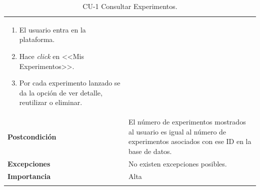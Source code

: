 \begin{longtable}[H]{@{}ll@{}}
\begin{minipage}[t]{0.71\columnwidth}
\begin{enumerate}
\def\labelenumi{\arabic{enumi}.}
\tightlist
\item El usuario entra en la plataforma.
\item Hace \textit{click} en <<Mis Experimentos>>.
\item Por cada experimento lanzado se da la opción de ver detalle, reutilizar o eliminar.
\end{enumerate}\strut
\end{minipage}\tabularnewline
\begin{minipage}[t]{0.23\columnwidth}\raggedright\strut
\textbf{Postcondición}\strut
\end{minipage} & \begin{minipage}[t]{0.71\columnwidth}\raggedright\strut
El número de experimentos mostrados al usuario es igual al número de experimentos asociados con ese ID en la base de datos.\strut
\end{minipage}\tabularnewline
\begin{minipage}[t]{0.23\columnwidth}\raggedright\strut
\textbf{Excepciones}\strut
\end{minipage} & \begin{minipage}[t]{0.71\columnwidth}\raggedright\strut
No existen excepciones posibles.\strut
\end{minipage}\tabularnewline
\begin{minipage}[t]{0.23\columnwidth}\raggedright\strut
\textbf{Importancia}\strut
\end{minipage} & \begin{minipage}[t]{0.71\columnwidth}\raggedright\strut
Alta\strut
\end{minipage}\tabularnewline
\bottomrule
\caption{CU-1 Consultar Experimentos.}
\end{longtable}


